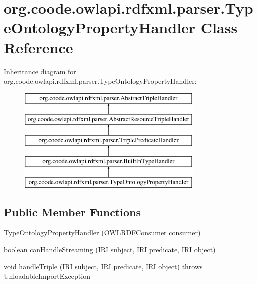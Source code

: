 \hypertarget{classorg_1_1coode_1_1owlapi_1_1rdfxml_1_1parser_1_1_type_ontology_property_handler}{\section{org.\-coode.\-owlapi.\-rdfxml.\-parser.\-Type\-Ontology\-Property\-Handler Class Reference}
\label{classorg_1_1coode_1_1owlapi_1_1rdfxml_1_1parser_1_1_type_ontology_property_handler}
}
Inheritance diagram for org.\-coode.\-owlapi.\-rdfxml.\-parser.\-Type\-Ontology\-Property\-Handler\-:\begin{figure}[H]
\begin{center}
\leavevmode
\includegraphics[height=5.000000cm]{classorg_1_1coode_1_1owlapi_1_1rdfxml_1_1parser_1_1_type_ontology_property_handler}
\end{center}
\end{figure}
\subsection*{Public Member Functions}
\begin{DoxyCompactItemize}
\item 
\hyperlink{classorg_1_1coode_1_1owlapi_1_1rdfxml_1_1parser_1_1_type_ontology_property_handler_a7ed819ac4a70a219941f94079bcd2422}{Type\-Ontology\-Property\-Handler} (\hyperlink{classorg_1_1coode_1_1owlapi_1_1rdfxml_1_1parser_1_1_o_w_l_r_d_f_consumer}{O\-W\-L\-R\-D\-F\-Consumer} \hyperlink{classorg_1_1coode_1_1owlapi_1_1rdfxml_1_1parser_1_1_abstract_triple_handler_a4ccf4d898ff01eb1cadfa04b23d54e9c}{consumer})
\item 
boolean \hyperlink{classorg_1_1coode_1_1owlapi_1_1rdfxml_1_1parser_1_1_type_ontology_property_handler_a793fb370e74b1016e45ecdffdf48ab8e}{can\-Handle\-Streaming} (\hyperlink{classorg_1_1semanticweb_1_1owlapi_1_1model_1_1_i_r_i}{I\-R\-I} subject, \hyperlink{classorg_1_1semanticweb_1_1owlapi_1_1model_1_1_i_r_i}{I\-R\-I} predicate, \hyperlink{classorg_1_1semanticweb_1_1owlapi_1_1model_1_1_i_r_i}{I\-R\-I} object)
\item 
void \hyperlink{classorg_1_1coode_1_1owlapi_1_1rdfxml_1_1parser_1_1_type_ontology_property_handler_af66885e12ce90d5746c20790e41e4459}{handle\-Triple} (\hyperlink{classorg_1_1semanticweb_1_1owlapi_1_1model_1_1_i_r_i}{I\-R\-I} subject, \hyperlink{classorg_1_1semanticweb_1_1owlapi_1_1model_1_1_i_r_i}{I\-R\-I} predicate, \hyperlink{classorg_1_1semanticweb_1_1owlapi_1_1model_1_1_i_r_i}{I\-R\-I} object)  throws Unloadable\-Import\-Exception 
\end{DoxyCompactItemize}
